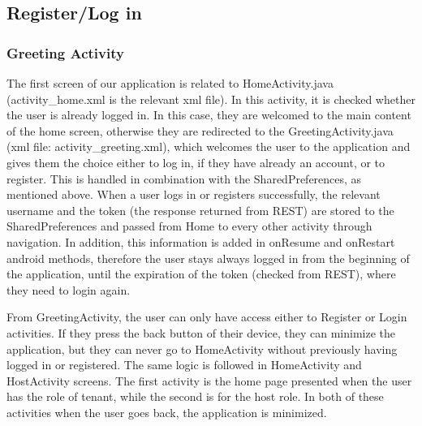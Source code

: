 \documentclass[12pt]{article}
\begin{document}
	\subsection{Register/Log in}
	
	\subsubsection{Greeting Activity}
	The first screen of our application is related to HomeActivity.java (activity\_home.xml is the relevant xml file). In this activity, it is checked whether the user is already logged in. In this case, they are welcomed to the main content of the home screen, otherwise they are redirected to the GreetingActivity.java (xml file: activity\_greeting.xml), which welcomes the user to the application and gives them the choice either to log in, if they have already an account, or to register. This is handled in combination with the SharedPreferences, as mentioned above. When a user logs in or registers successfully, the relevant username and the token (the response returned from REST) are stored to the SharedPreferences and passed from Home to every other activity through navigation. In addition, this information is added in onResume and onRestart android methods, therefore the user stays always logged in from the beginning of the application, until the expiration of the token (checked from REST), where they need to login again.
	
	From GreetingActivity, the user can only have access either to Register or Login activities. If they press the back button of their device, they can minimize the application, but they can never go to HomeActivity without previously having logged in or registered. The same logic is followed in HomeActivity and HostActivity screens. The first activity is the home page presented when the user has the role of tenant, while the second is for the host role. In both of these activities when the user goes back, the application is minimized.
	
\end{document}
